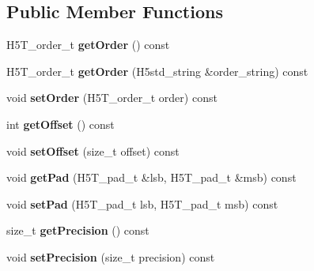 \subsection*{Public Member Functions}
\begin{DoxyCompactItemize}
\item 
\mbox{\label{class_h5_1_1_atom_type_a4cc64f4f58fdcbd9f2e9b5d72a2c7f5d}} 
H5\+T\+\_\+order\+\_\+t {\bfseries get\+Order} () const
\item 
\mbox{\label{class_h5_1_1_atom_type_a43fcbc0f9058acd436bd141e19500d4d}} 
H5\+T\+\_\+order\+\_\+t {\bfseries get\+Order} (H5std\+\_\+string \&order\+\_\+string) const
\item 
\mbox{\label{class_h5_1_1_atom_type_a2cd6cd68a223154dc08c037e03d59b6d}} 
void {\bfseries set\+Order} (H5\+T\+\_\+order\+\_\+t order) const
\item 
\mbox{\label{class_h5_1_1_atom_type_ab26e5f4e6898b740a84aa1c8cf09461e}} 
int {\bfseries get\+Offset} () const
\item 
\mbox{\label{class_h5_1_1_atom_type_ad3d58451829f62baf08f663f7153d267}} 
void {\bfseries set\+Offset} (size\+\_\+t offset) const
\item 
\mbox{\label{class_h5_1_1_atom_type_a537783731fe233e56db447e767db32d1}} 
void {\bfseries get\+Pad} (H5\+T\+\_\+pad\+\_\+t \&lsb, H5\+T\+\_\+pad\+\_\+t \&msb) const
\item 
\mbox{\label{class_h5_1_1_atom_type_a9968256a9b2a59bf2c7a6dde32a477c9}} 
void {\bfseries set\+Pad} (H5\+T\+\_\+pad\+\_\+t lsb, H5\+T\+\_\+pad\+\_\+t msb) const
\item 
\mbox{\label{class_h5_1_1_atom_type_a7b716513bf9d91062acc65e6b614cd38}} 
size\+\_\+t {\bfseries get\+Precision} () const
\item 
\mbox{\label{class_h5_1_1_atom_type_aa764d901764a47660ab2ef5a11427c91}} 
void {\bfseries set\+Precision} (size\+\_\+t precision) const
\item 

\end{DoxyCompactItemize}
